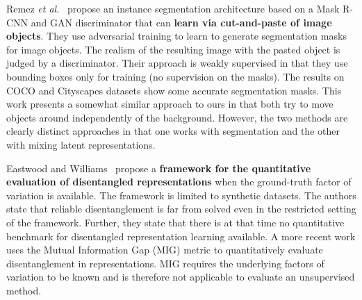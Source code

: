 \documentclass[12pt,a4paper]{article}
\begin{document}
Remez \textit{et al.}~\cite{CutAndPaste} propose an instance segmentation architecture based on a Mask R-CNN and GAN discriminator that can \textbf{learn via cut-and-paste of image objects}. They use adversarial training to learn to generate segmentation masks for image objects. The realism of the resulting image with the pasted object is judged by a discriminator. Their approach is weakly supervised in that they use bounding boxes only for training (no supervision on the masks). The results on COCO and Cityscapes datasets show some accurate segmentation masks. This work presents a somewhat similar approach to ours in that both try to move objects around independently of the background. However, the two methods are clearly distinct approaches in that one works with segmentation and the other with mixing latent representations.

\par Eastwood and Williams~\cite{FwkQuantEvalDisRep} propose a \textbf{framework for the quantitative evaluation of disentangled representations} when the ground-truth factor of variation is available. The framework is limited to synthetic datasets. The authors state that reliable disentanglement is far from solved even in the restricted setting of the framework. Further, they state that there is at that time no quantitative benchmark for disentangled representation learning available. A more recent work \cite{SpatialBDecoder} uses the Mutual Information Gap (MIG) metric to quantitatively evaluate disentanglement in representations. MIG requires the underlying factors of variation to be known and is therefore not applicable to evaluate an unsupervised method.
\end{document}
